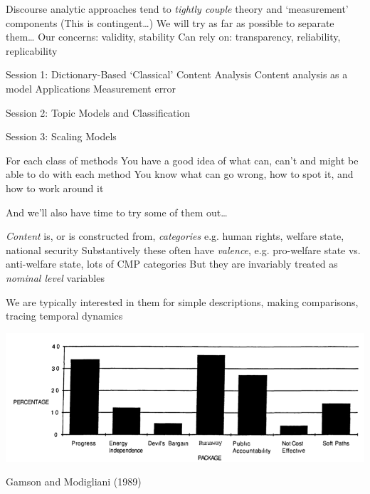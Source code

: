 \documentclass{mediumfoils}
\begin{document}

Discourse analytic approaches tend to \textit{tightly couple} theory and `measurement' components
\ita
\itm (This is contingent\ldots)
\itz
We will try as far as possible to separate them\ldots
\ita
\itm Our concerns: validity, stability
\itm Can rely on: transparency, reliability, replicability
\itz




Session 1: 
\ita
\itm Dictionary-Based `Classical' Content Analysis
\ita
\itm Content analysis as a model
\itm Applications
\itm Measurement error
\itz
\itz

Session 2: Topic Models and Classification

Session 3: Scaling Models


For each class of methods
\ita
\itm You have a good idea of what can, can't and might be able to do with each method
\itm You know what can go wrong, how to spot it, and how to work around it
\itz

And we'll also have time to try some of them out\ldots


\slide{}



\textsl{Content} is, or is constructed from, \textsl{categories} e.g.
\ita
\itm human rights, welfare state, national security
\itz
Substantively these often have \textsl{valence}, e.g.
\ita
\itm pro-welfare state vs. anti-welfare state, lots of CMP categories
\itz
But they are invariably treated as \textsl{nominal level} variables

We are typically interested in them for
\ita
\itm simple descriptions, making comparisons, tracing temporal dynamics
\itz


\centerline{\includegraphics[scale=.8]{pictures/gamson-modigliani-frames-opinion}}
Gamson and Modigliani (1989)
\end{document}
